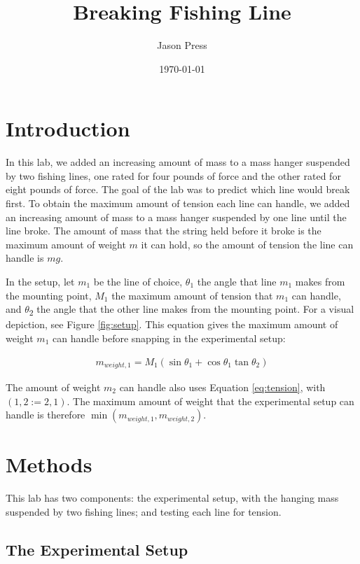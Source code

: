 \documentclass[12pt]{article}
\author{Jason Press}
\date{\today}
\title{Breaking Fishing Line}
\begin{document}
\maketitle
\section{Introduction}
\label{sec:org6c10fd9}

In this lab, we added an increasing amount of mass to a mass hanger suspended by two fishing lines, one rated for four pounds of force and the other rated for eight pounds of force. The goal of the lab was to predict which line would break first. To obtain the maximum amount of tension each line can handle, we added an increasing amount of mass to a mass hanger suspended by one line until the line broke. The amount of mass that the string held before it broke is the maximum amount of weight \(m\) it can hold, so the amount of tension the line can handle is \(mg\).

In the setup, let \(m_1\) be the line of choice, \(\theta_1\) the angle that line \(m_1\) makes from the mounting point, \(M_1\) the maximum amount of tension that \(m_1\) can handle, and \(\theta\)\textsubscript{2} the angle that the other line makes from the mounting point. For a visual depiction, see Figure \ref{fig:setup}. This equation gives the maximum amount of weight \(m_1\) can handle before snapping in the experimental setup:

\begin{align}\label{eq:tension}
m_{weight,1} = M_{1} \left( \sin\theta_1 + \cos\theta_1\tan\theta_2 \right)
\end{align}

The amount of weight \(m_2\) can handle also uses Equation \ref{eq:tension}, with \((1,2 := 2,1)\). The maximum amount of weight that the experimental setup can handle is therefore \(\min(m_{weight,1}, m_{weight,2})\).
\section{Methods}
\label{sec:org8e53272}

This lab has two components: the experimental setup, with the hanging mass suspended by two fishing lines; and testing each line for tension.
\subsection{The Experimental Setup}
\label{sec:org94cd7a6}
\end{document}
